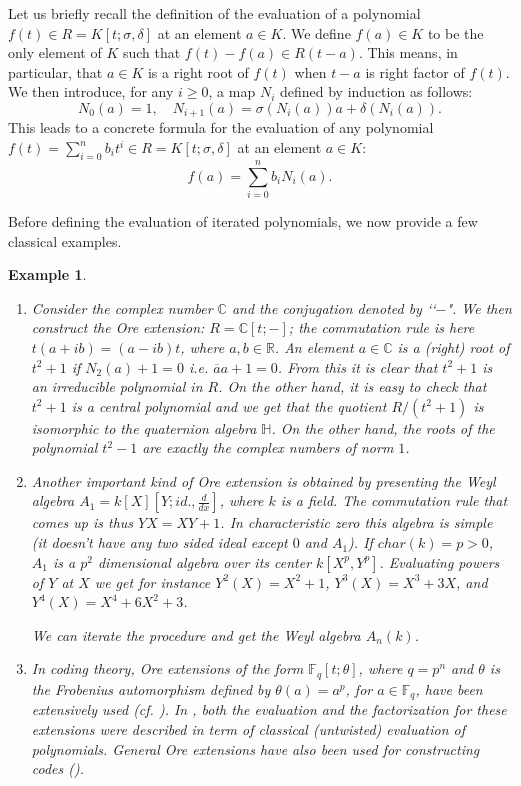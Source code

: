 \documentclass{amsproc}
\newcommand{\de}{\delta}
\newcommand{\si}{\sigma}
\newtheorem{example}[theorem]{Example}
\numberwithin{equation}{section}
\begin{document}
Let us briefly recall the definition of the evaluation of a polynomial $f(t)\in R=K[t;\si,\de]$ at an element $a \in K$.
We define $f(a)\in K$ to be the only element of $K$ such that $f(t)-f(a)\in R(t-a)$.   This means, in particular, that $a\in K$ is a right root of $f(t)$ when $t-a$ is right factor of $f(t)$.   We then introduce, for any $i\ge 0$, a  map $N_i$ defined by induction as follows:
$$
N_0(a)=1,\quad N_{i+1}(a)=\si(N_i(a))a + \de(N_i(a)). 
$$ 
This leads to a concrete formula for the evaluation of any polynomial $f(t)=\sum_{i=0}^nb_it^i\in R=K[t;\si,\de]$ at an element $a\in K$:
$$
f(a)=\sum_{i=0}^{n}b_iN_i(a).
$$

Before defining the evaluation of iterated polynomials, we now provide a few classical examples.
\begin{example}
	{\rm 
		\begin{enumerate}
		\item[(1)] Consider the complex number $\mathbb{C}$ and the conjugation denoted by \lq\lq $-$".  We then construct the Ore extension: $R=\mathbb{C} [t;-]$; the commutation rule is here $t(a+ib)=(a-ib)t$, where $a,b\in \mathbb R$.  An element $a\in \mathbb C$ is a (right) root of $t^2+1$
		if $N_2(a) +1=0$ i.e. $\overline{a}a+1=0$.  From this it is clear that $t^2+1$ is an irreducible polynomial in $R$.   On the other hand, it is easy to check that $ t^2+1$ is a central polynomial and we get that the quotient $R/(t^2+1)$ is isomorphic to the quaternion algebra $\mathbb H$.  On the other hand, the roots of the polynomial $t^2-1$ are exactly the complex numbers of norm $1$.
		\item[(2)] Another important kind of Ore extension is obtained by presenting the Weyl algebra $A_1=k[X][Y;id.,\frac{d}{dx}]$, where $k$ is a field.  The commutation rule that comes up is thus $YX=XY +1$.  In characteristic zero this algebra is simple (it doesn't have any two sided ideal except $0$ and $A_1$).
		If $char(k)=p>0$, $A_1$ is a $p^2$ dimensional algebra
		over its center $k[X^p,Y^p]$.  Evaluating powers of $Y$ at $X$ we get for instance $Y^2(X)=X^2+1$, $Y^3(X)=X^3+3X$, and $Y^4(X)=X^4+6X^2+3$.
		
		\noindent We can iterate the procedure and get the Weyl algebra $A_n(k)$.
		
		\item[(3)] In coding theory, Ore extensions of the form  $\mathbb F_q[t;\theta]$, where $q=p^n$ and $\theta$ is the Frobenius automorphism defined by  $\theta(a)=a^p$, for $a\in \mathbb F_q$, have been extensively used (cf. \cite{BU}).  In \cite{L2}, both the evaluation and the factorization for these extensions were described in term of classical (untwisted) evaluation of polynomials.  General Ore extensions have also been used for constructing codes (\cite{BL}).
	\end{enumerate}
	}
\end{example}
\end{document}

